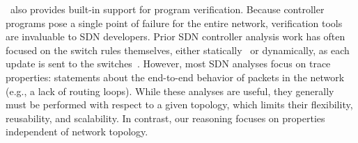 \flowlog\ also provides built-in support for program verification. 
Because controller programs pose a single point of failure for the
entire network, verification tools
are invaluable to SDN developers. Prior SDN
controller analysis work has often focused on the switch rules themselves, either
statically~\cite{alshaer:safeconfig10-flowchecker,kazemian:nsdi12-hsa,mai:sigcomm11-anteater,reitblatt:sigcomm12-consistent-updates}
or dynamically, as each update is sent to the
switches~\cite{porras:hotsdn12-fortnox}. 
However, most SDN analyses focus on trace properties: statements
about the end-to-end behavior of packets in the network  (e.g., a lack of
routing loops). While these analyses are useful, they generally must be
performed with respect to a given topology, which 
limits their flexibility, reusability, and scalability. In contrast, our reasoning 
focuses on properties independent of network topology. 



